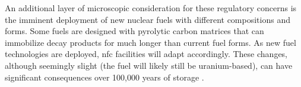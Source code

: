 An additional layer of microscopic consideration for these regulatory concerns
is the imminent deployment of new nuclear fuels with different compositions and
forms. Some fuels are designed with pyrolytic carbon matrices that can
immobilize decay products for much longer than current fuel forms. As new fuel
technologies are deployed, \gls{nfc} facilities will adapt accordingly. These changes, although seemingly slight (the fuel will likely still be uranium-based), can have significant consequences over 100,000 years
of storage \cite{hyland_post_closure_2013}.